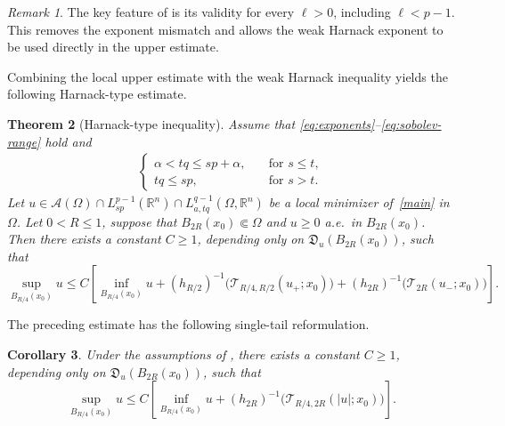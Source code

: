 \documentclass[reqno]{amsart}
\newcommand{\R}{\mathbb R}
\newcommand{\calT}{\mathcal T}
\theoremstyle{plain}
\newtheorem{theorem}{Theorem}[section]
\newtheorem{corollary}[theorem]{Corollary}
\theoremstyle{definition}
\theoremstyle{remark}
\newtheorem{remark}[theorem]{Remark}
\numberwithin{equation}{section}
\begin{document}
\begin{remark}
The key feature of  is its validity for every \(\ell>0\), including \(\ell<p-1\).  This removes the exponent mismatch and
allows the weak Harnack exponent to be used directly in the upper estimate. %
\end{remark}

Combining the local upper estimate with the weak Harnack inequality yields the
following Harnack-type estimate.

\begin{theorem}[Harnack-type inequality]
\label{thm:harnack-tail}
Assume that \eqref{eq:exponents}--\eqref{eq:sobolev-range} hold and
\begin{align*}
\begin{cases}
\alpha<tq \leq sp+\alpha,  \quad &\text{for  } s\le t,\\[2mm]
tq\le sp,        \quad&\text{for  } s>t.
\end{cases}
\end{align*}
Let \(u\in\mathcal{A}(\Omega)\cap L^{p-1}_{sp}(\R^n)
\cap L^{q-1}_{a,tq}(\Omega,\R^n)\) be a local minimizer
of~\eqref{main} in \(\Omega\). Let \(0<R\le1\), suppose that
\(B_{2R}(x_0)\Subset\Omega\) and \(u\ge0\) a.e.\ in
\(B_{2R}(x_0)\).
Then there exists a constant \(C\ge1\), depending only on
\(\mathfrak D_u(B_{2R}(x_0))\), such that
\begin{equation}\label{eq:harnack-tail}
    \sup_{B_{R/4}(x_0)}u
    \le
    C\left[\inf_{B_{R/4}(x_0)}u+(h_{R/2})^{-1}\bigl(\calT_{R/4,R/2}(u_+;x_0)\bigr)+(h_{2R})^{-1}\bigl(\calT_{2R}(u_-;x_0)\bigr)\right].
\end{equation}
\end{theorem}

The preceding estimate has the following single-tail reformulation.

\begin{corollary}\label{cor:harnack-single-tail}
Under the assumptions of , there exists a constant
\(C\ge1\), depending only on \(\mathfrak D_u(B_{2R}(x_0))\), such that
\begin{equation}\label{eq:harnack-single-tail}
    \sup_{B_{R/4}(x_0)}u\le
    C\left[\inf_{B_{R/4}(x_0)}u+(h_{2R})^{-1}\bigl(\calT_{R/4,2R}(|u|;x_0)\bigr)\right].
\end{equation}
\end{corollary}
\end{document}
